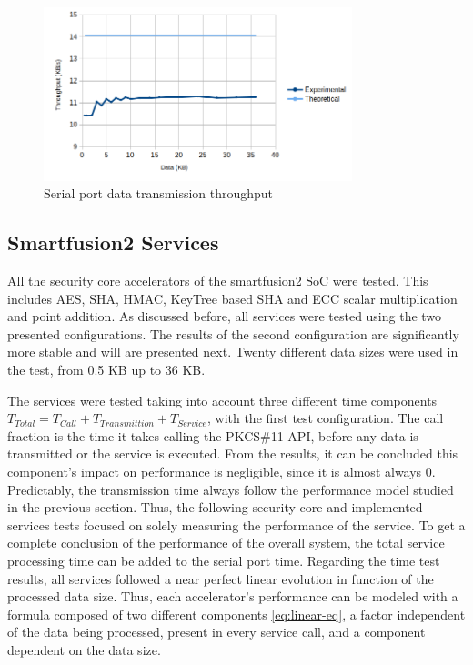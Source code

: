 \begin{figure}[h!]
	\centering
	\includegraphics[width=0.8\textwidth]{./Images/comms-tput.png}
	\caption{Serial port data transmission throughput}
	\label{fig:comms:tput}
\end{figure}

\subsection{Smartfusion2 Services}\label{chap:evaluation:board}

All the security core accelerators of the smartfusion2 SoC were tested. This includes \ac{AES}, \ac{SHA}, \ac{HMAC}, KeyTree based \ac{SHA} and \ac{ECC} scalar multiplication and point addition.
As discussed before, all services were tested using the two presented configurations. The results of the second configuration are significantly more stable and will are presented next.
Twenty different data sizes were used in the test, from 0.5 KB up to 36 KB.

The services were tested taking into account three different time components \(T_{Total} = T_{Call} + T_{Transmittion} + T_{Service}\), with the first test configuration. The call fraction is the time it takes calling the PKCS\#11 API, before any data is transmitted or the service is executed. From the results, it can be concluded this component's impact on performance is negligible, since it is almost always 0.
Predictably, the transmission time always follow the performance model studied in the previous section.
Thus, the following security core and implemented services tests focused on solely measuring the performance of the service. To get a complete conclusion of the performance of the overall system, the total service processing time can be added to the serial port time.
Regarding the time test results, all services followed a near perfect linear evolution in function of the processed data size. Thus, each accelerator's performance can be modeled with a formula composed of two different components \ref{eq:linear-eq}, a factor independent of the data being processed, present in every service call, and a component dependent on the data size.

